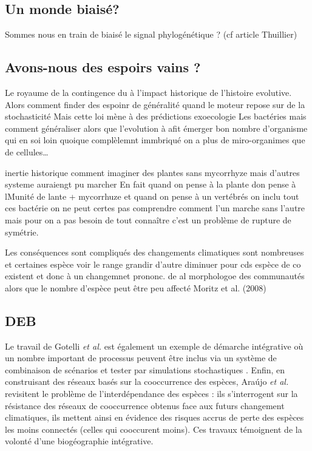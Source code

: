 \subsection*{Un monde biaisé?}\label{un-monde-biaisuxe9}

Sommes nous en train de biaisé le signal phylogénétique ? (cf article
Thuillier)

\subsection{Avons-nous des espoirs vains
?}\label{avons-nous-des-espoirs-vains}

Le royaume de la contingence du à l'impact historique de l'histoire
evolutive. Alors comment finder des espoinr de généralité quand le
moteur repose sur de la stochasticité Mais cette loi mène à des
prédictions exoecologie Les bactéries mais comment généraliser alors que
l'evolution à afit émerger bon nombre d'organisme qui en soi loin
quoique complèlemnt immbriqué on a plus de miro-organimes que de
cellules\ldots{}

inertie historique comment imaginer des plantes sans mycorrhyze mais
d'autres systeme auraiengt pu marcher En fait quand on pense à la plante
don pense à lMunité de lante + mycorrhuze et quand on pense à un
vertébrés on inclu tout ces bactérie on ne peut certes pas comprendre
comment l'un marche sans l'autre mais pour on a pas besoin de tout
connaître c'est un problème de rupture de symétrie.

Les conséquences sont compliqués des changements climatiques sont
nombreuses et certaines espèce voir le range grandir d'autre diminuer
pour cds espèce de co existent et donc à un changemnet prononc. de al
morphologoe des communautés alors que le nombre d'espèce peut être peu
affecté Moritz et al. (2008)

\subsection{DEB}\label{deb}

Le travail de Gotelli \textit{et al.} est également un exemple de
démarche intégrative où un nombre important de processus peuvent être
inclus via un système de combinaison de scénarios et tester par
simulations stochastiques \cite{Gotelli2009}. Enfin, en construisant des
réseaux basés sur la cooccurrence des espèces, Araújo \textit{et al.}
revisitent le problème de l'interdépendance des espèces
\cite{Araujo2011} : ils s'interrogent sur la résistance des réseaux de
cooccurrence obtenus face aux futurs changement climatiques, ils mettent
ainsi en évidence des risques accrus de perte des espèces les moins
connectés (celles qui cooccurent moins). Ces travaux témoignent de la
volonté d'une biogéographie intégrative.

